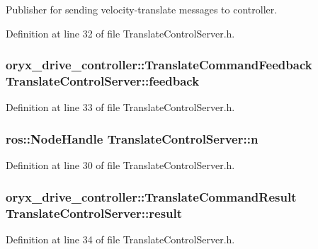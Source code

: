 \-Publisher for sending velocity-\/translate messages to controller. 



\-Definition at line 32 of file \-Translate\-Control\-Server.\-h.

\subsubsection[{feedback}]{\setlength{\rightskip}{0pt plus 5cm}oryx\-\_\-drive\-\_\-controller\-::\-Translate\-Command\-Feedback {\bf \-Translate\-Control\-Server\-::feedback}\hspace{0.3cm}{\ttfamily  [private]}}\label{classTranslateControlServer_a4409bee4c271657fe56f729901ba1e4a}


\-Definition at line 33 of file \-Translate\-Control\-Server.\-h.

\subsubsection[{n}]{\setlength{\rightskip}{0pt plus 5cm}ros\-::\-Node\-Handle {\bf \-Translate\-Control\-Server\-::n}\hspace{0.3cm}{\ttfamily  [private]}}\label{classTranslateControlServer_ac2af712474c85b6c91f5a4c10ba45dee}


\-Definition at line 30 of file \-Translate\-Control\-Server.\-h.

\subsubsection[{result}]{\setlength{\rightskip}{0pt plus 5cm}oryx\-\_\-drive\-\_\-controller\-::\-Translate\-Command\-Result {\bf \-Translate\-Control\-Server\-::result}\hspace{0.3cm}{\ttfamily  [private]}}\label{classTranslateControlServer_a59eb67af2de81ebb5b251b4f41e36759}


\-Definition at line 34 of file \-Translate\-Control\-Server.\-h.


